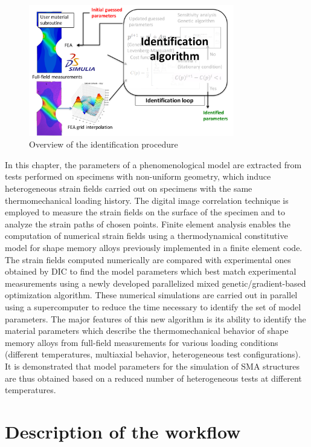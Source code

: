 \begin{figure}
\begin{center}
 \includegraphics[width=0.8\textwidth]{1_Identification/identification-procedure}
 \caption{Overview of the identification procedure}
 \label{fig:identproc}
\end{center}
\end{figure}

In this chapter, the parameters of a phenomenological model are extracted from tests performed on specimens with non-uniform geometry, which induce heterogeneous strain fields carried out on specimens with the same thermomechanical loading history. The digital image correlation technique is employed to measure the strain fields on the surface of the specimen and to analyze the strain paths of chosen points. Finite element analysis enables the computation of numerical strain fields using a thermodynamical constitutive model for shape memory alloys previously implemented in a finite element code. The strain fields computed numerically are compared with experimental ones obtained by DIC to find the model parameters which best match experimental measurements using a newly developed parallelized mixed genetic/gradient-based optimization algorithm.  These numerical simulations are carried out in parallel using a supercomputer to reduce the time necessary to identify the set of model parameters. The major features of this new algorithm is its ability to identify the material parameters which describe the thermomechanical behavior of shape memory alloys from full-field measurements for various loading conditions (different temperatures, multiaxial behavior, heterogeneous test configurations).
It is demonstrated that model parameters for the simulation of SMA structures are thus obtained based on a reduced number of heterogeneous tests at different temperatures.

\section{Description of the workflow}
\label{sec:workflow}

